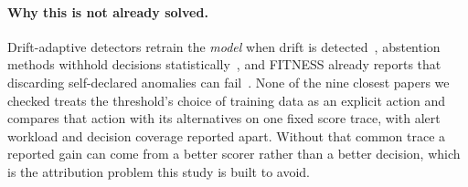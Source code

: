 \paragraph{Why this is not already solved.}
Drift-adaptive detectors retrain the \emph{model} when drift is
detected~\citep{yang2026ddade, li2026adapts, xu2024cddia}, abstention methods withhold
decisions statistically~\citep{sun2024online, perini2023rejection}, and FITNESS already
reports that discarding self-declared anomalies can fail~\citep{sankararaman2022fitness}.
None of the nine closest papers we checked treats the threshold's choice of training
data as an explicit action and compares that action with its alternatives on one fixed
score trace, with alert workload and decision coverage reported apart. Without that
common trace a reported gain can come from a better scorer rather than a better
decision, which is the attribution problem this study is built to avoid.
